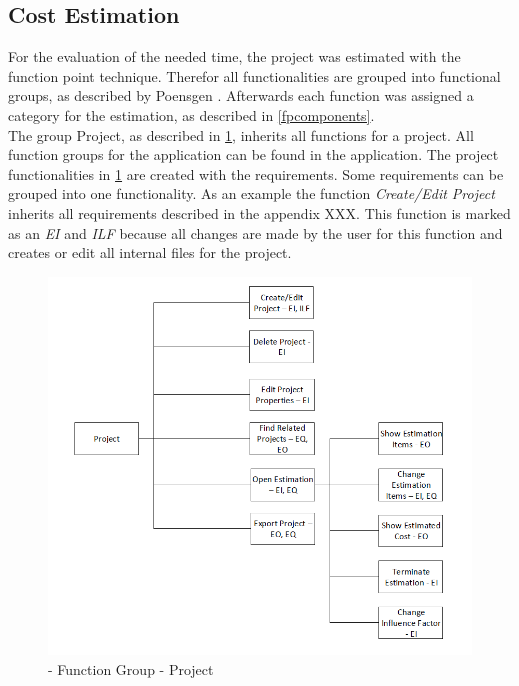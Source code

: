\subsection{Cost Estimation}
For the evaluation of the needed time, the project was estimated with the function point technique. Therefor all functionalities are grouped into functional groups, as described by Poensgen \cite{FPKompakt}. Afterwards each function was assigned a category for the estimation, as described in \ref{fpcomponents}.\\
The group Project, as described in \ref{fig:projectFunctionalityGroup}, inherits all functions for a project. All function groups for the application can be found in the application. The project functionalities in \ref{fig:projectFunctionalityGroup} are created with the requirements. Some requirements can be grouped into one functionality. As an example the function \textit{Create/Edit Project} inherits all requirements described in the appendix XXX. This function is marked as an \textit{EI} and \textit{ILF} because all changes are made by the user for this function and creates or edit all internal files for the project. \\
\begin{figure}[h] 
	\centering 
	\includegraphics[width=14cm]{images/ScreenOverviewProject.PNG} 
	\caption{- Function Group - Project} 
	\label{fig:projectFunctionalityGroup}
\end{figure}\\
